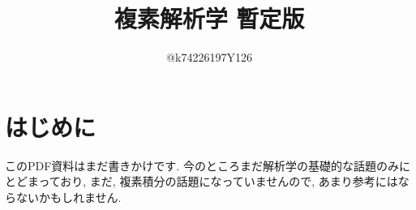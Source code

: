 \documentclass[10pt,a4paper,titlepage]{jsarticle}
\title{複素解析学 暫定版}
\author{@k74226197Y126}
\begin{document}
\maketitle
{}
\section*{はじめに}
\par
このPDF資料はまだ書きかけです. 今のところまだ解析学の基礎的な話題のみにとどまっており, まだ, 複素積分の話題になっていませんので, あまり参考にはならないかもしれません. 
\tableofcontents
\clearpage
{}


\clearpage

\clearpage

\clearpage

\clearpage

\clearpage


\clearpage

\clearpage

\clearpage

\clearpage
\clearpage


\clearpage

\clearpage

\clearpage


\clearpage

\clearpage

%
\end{document}
